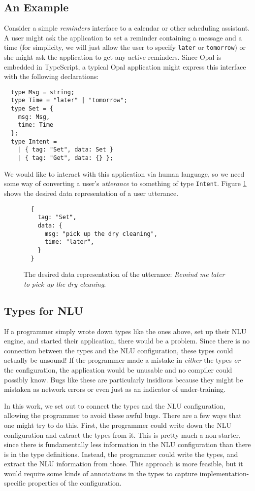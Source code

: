 \documentclass[twocolumn]{article}
\newcommand{\ts}[1]{\texttt{#1}}
\begin{document}
\subsection{An Example}
Consider a simple \emph{reminders} interface to a calendar or other scheduling
assistant. A user might ask the application to set a reminder containing a
message and a time (for simplicity, we will just allow the user to specify
\ts{later} or \ts{tomorrow}) or she might ask the application to get any active
reminders. Since Opal is embedded in TypeScript,\cite{typescript} a typical Opal
application might express this interface with the following declarations:
\begin{verbatim}
  type Msg = string;
  type Time = "later" | "tomorrow";
  type Set = {
    msg: Msg,
    time: Time
  };
  type Intent =
    | { tag: "Set", data: Set }
    | { tag: "Get", data: {} };
\end{verbatim}

We would like to interact with this application via human language, so we need
some way of converting a user's \emph{utterance} to something of type
\ts{Intent}. Figure \ref{fig:drycleaning} shows the desired data representation
of a user utterance.

\begin{figure}
\begin{verbatim}
  {
    tag: "Set",
    data: {
      msg: "pick up the dry cleaning",
      time: "later",
    }
  }
\end{verbatim}
  \caption{The desired data representation of the utterance: \emph{Remind me
      later to pick up the dry cleaning}.}
  \label{fig:drycleaning}
\end{figure}

\subsection{Types for NLU}
If a programmer simply wrote down types like the ones above, set up their NLU
engine, and started their application, there would be a problem. Since there is
no connection between the types and the NLU configuration, these types could
actually be unsound! If the programmer made a mistake in \emph{either} the types
\emph{or} the configuration, the application would be unusable and no compiler
could possibly know. Bugs like these are particularly insidious because they
might be mistaken as network errors or even just as an indicator of
under-training.

In this work, we set out to connect the types and the NLU configuration,
allowing the programmer to avoid these awful bugs. There are a few ways that one
might try to do this. First, the programmer could write down the NLU
configuration and extract the types from it. This is pretty much a non-starter,
since there is fundamentally less information in the NLU configuration than
there is in the type definitions. Instead, the programmer could write the types,
and extract the NLU information from those. This approach is more feasible, but
it would require some kinds of annotations in the types to capture
implementation-specific properties of the configuration.
\end{document}
